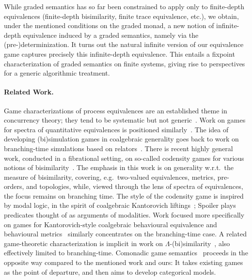 \documentclass[sigconf,
			final%
			nonacm
                        ]{acmart}
\numberwithin{equation}{section}
\numberwithin{equation}{section}
\theoremstyle{plain}
\theoremstyle{definition}
\begin{document}
While graded semantics has so far been constrained to apply only to
finite-depth equivalences (finite-depth bisimilarity, finite trace
equivalence, etc.), we obtain, under the mentioned conditions on the
graded monad, a new notion of infinite-depth equivalence induced by a
graded semantics, namely via the (pre-)determinization. It turns out
the natural infinite version of our equivalence game captures
precisely this infinite-depth equivalence. This entails %
a fixpoint characterization of graded semantics on finite systems,
giving rise to perspectives for a generic algorithmic treatment.

\paragraph{Related Work.} Game characterizations of process
equivalences are an established theme in concurrency theory; %
they tend to be systematic but not generic~\cite{Glabbeek90,CD08}.
Work on games for spectra of quantitative equivalences is positioned
similarly~\cite{FLT11,fl:quantitative-spectrum-journal}. The idea of developing \mbox{(bi)}simulation
games in coalgebraic generality goes back to work on branching-time
simulations based on relators~\cite{Baltag00}. There
is recent highly general work, conducted in a fibrational setting, on
so-called codensity games for various notions of
bisimilarity~\cite{kkhkh:codensity-games}. The emphasis in this work
is on generality w.r.t.~the measure of bisimilarity, covering,
e.g.~two-valued equivalences, metrics, pre-orders, and topologies,
while, %
viewed through the lens of spectra of equivalences, the
focus remains on branching time. The style of the codensity game is
inspired by modal logic, in the spirit of coalgebraic Kantorovich
liftings~\cite{BaldanEA18,WildSchroder20}; %
Spoiler plays predicates thought of as arguments of modalities.
Work focused more specifically on games for Kantorovich-style
coalgebraic behavioural equivalence and behavioural
metrics~\cite{km:bisim-games-logics-metric} similarly concentrates on
the branching-time case. A related game-theoretic characterization is
implicit in work on $\Lambda$-(bi)similarity~\cite{GorinSchroder13},
also effectively limited to branching-time. Comonadic game
semantics~\cite{ADW17, AS18, CD21} proceeds in the opposite way
compared to the mentioned work and ours: It takes existing games as
the point of departure, and then aims to develop categorical models.
\end{document}
